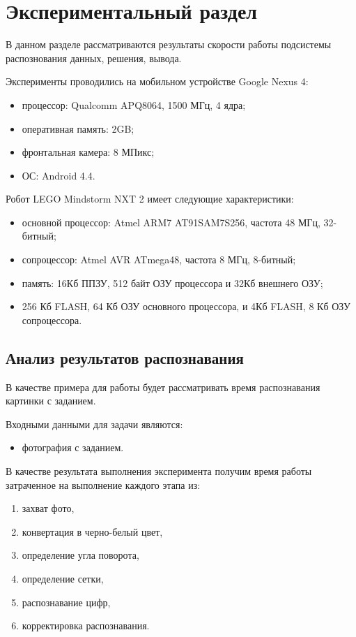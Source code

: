 \chapter{Экспериментальный раздел}
\label{cha:research}

В данном разделе рассматриваются результаты скорости работы подсистемы распознования данных, решения, вывода.

Эксперименты проводились на мобильном устройстве Google Nexus 4:
\begin{itemize}
	\item процессор: Qualcomm APQ8064, 1500 МГц, 4 ядра;
	\item оперативная память: 2GB;
	\item фронтальная камера: 8 МПикс;
	\item ОС: Android 4.4.
\end{itemize}

Робот LEGO Mindstorm NXT 2 имеет следующие характеристики:

\begin{itemize}
	\item основной процессор: Atmel ARM7 AT91SAM7S256, частота 48 МГц, 32-битный;
	\item сопроцессор: Atmel AVR ATmega48, частота 8 МГц, 8-битный;
	\item память: 16Кб ППЗУ, 512 байт ОЗУ процессора и  32Кб внешнего ОЗУ;
	\item 256 Кб FLASH, 64 Кб ОЗУ основного процессора, и 4Кб FLASH, 8 Кб ОЗУ сопроцессора.
\end{itemize}


\section{Анализ результатов распознавания}


В качестве примера для работы будет рассматривать время распознавания картинки с заданием.

Входными данными для задачи являются:

\begin{itemize}
	\item фотография с заданием.
\end{itemize}

В качестве результата выполнения эксперимента получим время работы затраченное на выполнение каждого этапа из:


\begin{enumerate}
	\item захват фото,
	\item конвертация в черно-белый цвет,
	\item определение угла поворота,
	\item определение сетки,
	\item распознавание цифр,
	\item корректировка распознавания.
\end{enumerate}
	
